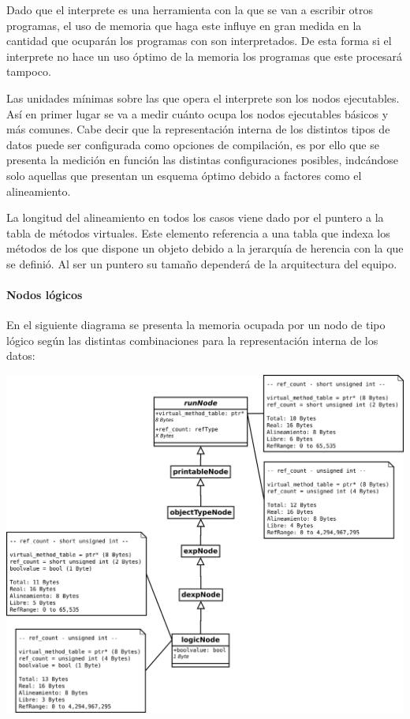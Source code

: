 Dado que el interprete es una herramienta con la que se van a escribir otros programas, el uso de memoria que haga este influye en gran medida 
en la cantidad que ocuparán los programas con son interpretados. De esta forma si el interprete no hace un uso óptimo de la memoria los programas que este procesará
tampoco. 

Las unidades mínimas sobre las que opera el interprete son los nodos ejecutables. Así en primer lugar se va a medir cuánto ocupa los nodos ejecutables básicos y más comunes. Cabe decir
que la representación interna de los distintos tipos de datos puede ser configurada como opciones de compilación, es por ello que se presenta la medición en función las distintas 
configuraciones posibles, indcándose solo aquellas que presentan un esquema óptimo debido a factores como el alineamiento.

La longitud del alineamiento en todos los casos viene dado por el puntero a la tabla de métodos virtuales. Este elemento referencia a una tabla que indexa los 
métodos de los que dispone un objeto debido a la jerarquía de herencia con la que se definió. Al ser un puntero su tamaño dependerá de la arquitectura del equipo.

\pagebreak 

\paragraph{Nodos lógicos}

En el siguiente diagrama se presenta la memoria ocupada por un nodo de tipo lógico según las distintas combinaciones para la representación interna de los datos:

\begin{center}
\includegraphics[scale=0.3]{memorySpaceLogic.png} \\
\end{center}

